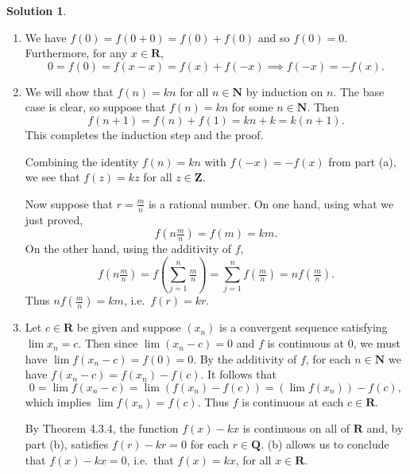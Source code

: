 \documentclass[12pt]{article}
\theoremstyle{definition}
\theoremstyle{exercise}
\theoremstyle{solution}
\newtheorem*{solution}{Solution}
\newcommand{\N}{\mathbf{N}}
\newcommand{\Z}{\mathbf{Z}}
\newcommand{\Q}{\mathbf{Q}}
\newcommand{\R}{\mathbf{R}}
\begin{document}
\begin{solution}
    \begin{enumerate}
        \item We have \( f(0) = f(0 + 0) = f(0) + f(0) \) and so \( f(0) = 0 \). Furthermore, for any \( x \in \R \),
        \[
            0 = f(0) = f(x - x) = f(x) + f(-x) \implies f(-x) = -f(x).
        \]

        \item We will show that \( f(n) = kn \) for all \( n \in \N \) by induction on \( n \). The base case is clear, so suppose that \( f(n) = kn \) for some \( n \in \N \). Then
        \[
            f(n + 1) = f(n) + f(1) = kn + k = k(n + 1).
        \]
        This completes the induction step and the proof.

        Combining the identity \( f(n) = kn \) with \( f(-x) = -f(x) \) from part (a), we see that \( f(z) = kz \) for all \( z \in \Z \).

        Now suppose that \( r = \tfrac{m}{n} \) is a rational number. On one hand, using what we just proved,
        \[
            f \left( n \tfrac{m}{n} \right) = f(m) = km.
        \]
        On the other hand, using the additivity of \( f \),
        \[
            f \left( n \tfrac{m}{n} \right) = f \left( \sum_{j=1}^n \tfrac{m}{n} \right) = \sum_{j=1}^n f \left( \tfrac{m}{n} \right) = n f \left( \tfrac{m}{n} \right).
        \]
        Thus \( n f \left( \tfrac{m}{n} \right) = km \), i.e.\ \( f(r) = kr \).

        \item Let \( c \in \R \) be given and suppose \( (x_n) \) is a convergent sequence satisfying \( \lim x_n = c \). Then since \( \lim (x_n - c) = 0 \) and \( f \) is continuous at 0, we must have \( \lim f(x_n - c) = f(0) = 0 \). By the additivity of \( f \), for each \( n \in \N \) we have \( f(x_n - c) = f(x_n) - f(c) \). It follows that
        \[
            0 = \lim f(x_n - c) = \lim (f(x_n) - f(c)) = (\lim f(x_n)) - f(c),
        \]
        which implies \( \lim f(x_n) = f(c) \). Thus \( f \) is continuous at each \( c \in \R \).

        By Theorem 4.3.4, the function \( f(x) - kx \) is continuous on all of \( \R \) and, by part (b), satisfies \( f(r) - kr = 0 \) for each \( r \in \Q \).  (b) allows us to conclude that \( f(x) - kx = 0 \), i.e.\ that \( f(x) = kx \), for all \( x \in \R \).
    \end{enumerate}
\end{solution}
\end{document}
